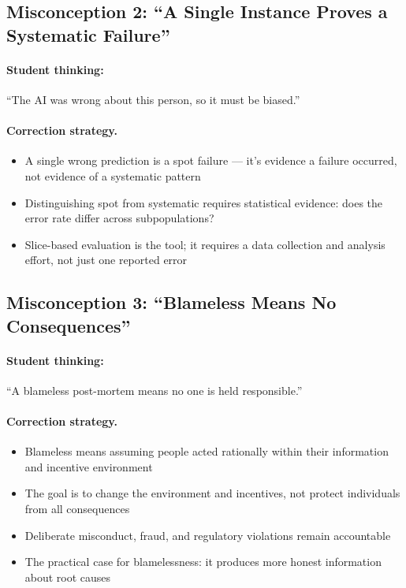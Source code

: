 \subsection{Misconception 2: ``A Single Instance Proves a Systematic Failure''}

\paragraph{Student thinking:} ``The AI was wrong about this person, so it must be biased.''

\paragraph{Correction strategy.}
\begin{itemize}
    \item A single wrong prediction is a spot failure --- it's evidence a failure occurred, not evidence of a systematic pattern
    \item Distinguishing spot from systematic requires statistical evidence: does the error rate differ across subpopulations?
    \item Slice-based evaluation is the tool; it requires a data collection and analysis effort, not just one reported error
\end{itemize}

\subsection{Misconception 3: ``Blameless Means No Consequences''}

\paragraph{Student thinking:} ``A blameless post-mortem means no one is held responsible.''

\paragraph{Correction strategy.}
\begin{itemize}
    \item Blameless means assuming people acted rationally within their information and incentive environment
    \item The goal is to change the environment and incentives, not protect individuals from all consequences
    \item Deliberate misconduct, fraud, and regulatory violations remain accountable
    \item The practical case for blamelessness: it produces more honest information about root causes
\end{itemize}

